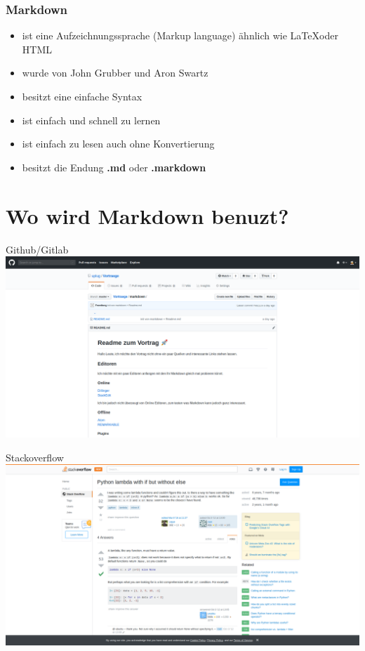\documentclass{beamer}
\begin{document}

\begin{frame} 
  \frametitle{Markdown} 
    \begin{itemize}
        \item ist eine Aufzeichnungssprache (Markup language) ähnlich wie \LaTeX oder HTML
        \item wurde von John Grubber und Aron Swartz
        \item besitzt eine einfache Syntax
        \item ist einfach und schnell zu lernen
        \item ist einfach zu lesen auch ohne Konvertierung 
        \item besitzt die Endung \textbf{.md} oder \textbf{.markdown}
    \end{itemize}
\end{frame}

\section{Wo wird Markdown benuzt?}


\begin{frame}{Github/Gitlab}
        \includegraphics[scale=0.18]{github.png}
\end{frame}


\begin{frame}{Stackoverflow}
        \includegraphics[scale=0.18]{stackoverflow.png}
\end{frame}
\end{document}
